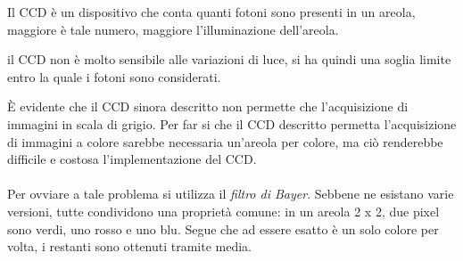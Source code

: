 \documentclass{subfiles}
\begin{document}
Il CCD è un dispositivo che conta quanti fotoni sono presenti in un areola, maggiore è tale numero, maggiore l'illuminazione dell'areola.

\begin{Remark*}
    il CCD non è molto sensibile alle variazioni di luce, si ha quindi una soglia limite entro la quale i fotoni sono considerati.
\end{Remark*}

\noindent \`E evidente che il CCD sinora descritto non permette che l'acquisizione di immagini in scala di grigio.
Per far si che il CCD descritto permetta l'acquisizione di immagini a colore sarebbe necessaria un'areola per colore,
ma ciò renderebbe difficile e costosa l'implementazione del CCD.
\\ \\
Per ovviare a tale problema si utilizza il \emph{filtro di Bayer}.
Sebbene ne esistano varie versioni, tutte condividono una proprietà comune: in un areola 2 x 2, due pixel sono verdi, uno rosso e uno blu.
Segue che ad essere esatto è un solo colore per volta, i restanti sono ottenuti tramite media.
\end{document}
